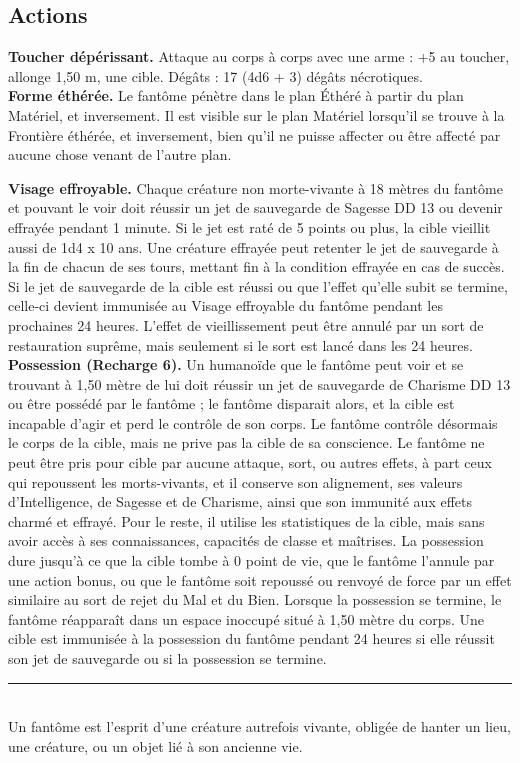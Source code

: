 \begin{figure*}[hbp]
{\begin{minipage}[c]{.45\linewidth}
    \subsection*{Actions}
    {\bfseries Toucher dépérissant.} Attaque au corps à corps avec une arme : +5 au toucher, allonge 1,50 m, une cible. Dégâts : 17 (4d6 + 3) dégâts nécrotiques. \\
    {\bfseries Forme éthérée.} Le fantôme pénètre dans le plan Éthéré à partir du plan Matériel, et inversement. Il est visible sur le plan Matériel lorsqu'il se trouve à la Frontière éthérée, et inversement, bien qu'il ne puisse affecter ou être affecté par aucune chose venant de l'autre plan. 
  \end{minipage}
  \hspace{4pt}
  \begin{minipage}[c]{.45\linewidth}
    {\bfseries Visage effroyable.} Chaque créature non morte-vivante à 18 mètres du fantôme et pouvant le voir doit réussir un jet de sauvegarde de Sagesse DD 13 ou devenir effrayée pendant 1 minute. Si le jet est raté de 5 points ou plus, la cible vieillit aussi de 1d4 x 10 ans. Une créature effrayée peut retenter le jet de sauvegarde à la fin de chacun de ses tours, mettant fin à la condition effrayée en cas de succès. Si le jet de sauvegarde de la cible est réussi ou que l'effet qu'elle subit se termine, celle-ci devient immunisée au Visage effroyable du fantôme pendant les prochaines 24 heures. L'effet de vieillissement peut être annulé par un sort de restauration suprême, mais seulement si le sort est lancé dans les 24 heures. \\
    {\bfseries Possession (Recharge 6).} Un humanoïde que le fantôme peut voir et se trouvant à 1,50 mètre de lui doit réussir un jet de sauvegarde de Charisme DD 13 ou être possédé par le fantôme ; le fantôme disparait alors, et la cible est incapable d'agir et perd le contrôle de son corps. Le fantôme contrôle désormais le corps de la cible, mais ne prive pas la cible de sa conscience. Le fantôme ne peut être pris pour cible par aucune attaque, sort, ou autres effets, à part ceux qui repoussent les morts-vivants, et il conserve son alignement, ses valeurs d'Intelligence, de Sagesse et de Charisme, ainsi que son immunité aux effets charmé et effrayé. Pour le reste, il utilise les statistiques de la cible, mais sans avoir accès à ses connaissances, capacités de classe et maîtrises. La possession dure jusqu'à ce que la cible tombe à 0 point de vie, que le fantôme l'annule par une action bonus, ou que le fantôme soit repoussé ou renvoyé de force par un effet similaire au sort de rejet du Mal et du Bien. Lorsque la possession se termine, le fantôme réapparaît dans un espace inoccupé situé à 1,50 mètre du corps. Une cible est immunisée à la possession du fantôme pendant 24 heures si elle réussit son jet de sauvegarde ou si la possession se termine. \\
    \noindent\rule{\textwidth}{1pt} \\
Un fantôme est l'esprit d'une créature autrefois vivante, obligée de hanter un lieu, une créature, ou un objet lié à son ancienne vie.
  \end{minipage}
}%
\end{figure*}

